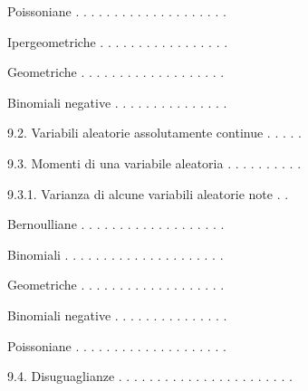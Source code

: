 \documentclass[a4paper,portrait,12pt]{article}
\begin{document}
\begin{flushleft}
Poissoniane . . . . . . . . . . . . . . . . . . . .
\end{flushleft}


\begin{flushleft}
Ipergeometriche . . . . . . . . . . . . . . . . .
\end{flushleft}


\begin{flushleft}
Geometriche . . . . . . . . . . . . . . . . . . .
\end{flushleft}


\begin{flushleft}
Binomiali negative . . . . . . . . . . . . . . .
\end{flushleft}


\begin{flushleft}
9.2. Variabili aleatorie assolutamente continue . . . . .
\end{flushleft}


\begin{flushleft}
9.3. Momenti di una variabile aleatoria . . . . . . . . . .
\end{flushleft}


\begin{flushleft}
9.3.1. Varianza di alcune variabili aleatorie note . .
\end{flushleft}


\begin{flushleft}
Bernoulliane . . . . . . . . . . . . . . . . . . .
\end{flushleft}


\begin{flushleft}
Binomiali . . . . . . . . . . . . . . . . . . . . .
\end{flushleft}


\begin{flushleft}
Geometriche . . . . . . . . . . . . . . . . . . .
\end{flushleft}


\begin{flushleft}
Binomiali negative . . . . . . . . . . . . . . .
\end{flushleft}


\begin{flushleft}
Poissoniane . . . . . . . . . . . . . . . . . . . .
\end{flushleft}


\begin{flushleft}
9.4. Disuguaglianze . . . . . . . . . . . . . . . . . . . . . . .
\end{flushleft}
\end{document}
